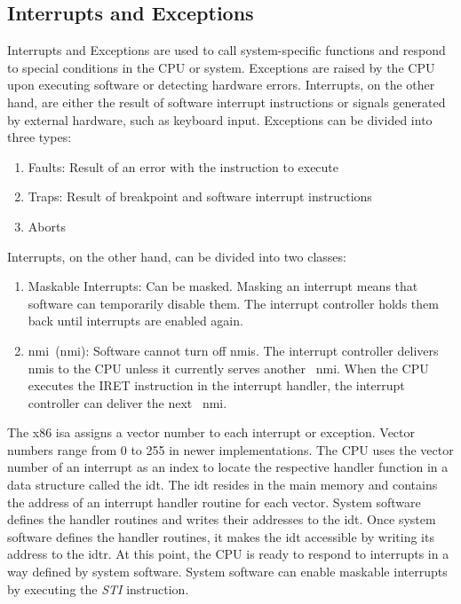 \subsection{Interrupts and Exceptions}
\label{sec:state:technical:interrupts}
Interrupts and Exceptions are used to call system-specific functions and respond
to special conditions in the CPU or system. Exceptions are raised by the CPU
upon executing software or detecting hardware errors. Interrupts, on the other
hand, are either the result of software interrupt instructions or signals
generated by external hardware, such as keyboard input. Exceptions can be
divided into three types:
\begin{enumerate}
    \item Faults: Result of an error with the instruction to execute
    \item Traps: Result of breakpoint and software interrupt instructions
    \item Aborts
\end{enumerate}
Interrupts, on the other hand, can be divided into two classes:
\begin{enumerate}
    \item Maskable Interrupts: Can be masked. Masking an interrupt means that
          software can temporarily disable them. The interrupt controller holds
          them back until interrupts are enabled again.
    \item \Gls{nmi}~(\gls{nmi}): Software cannot turn off
          \glspl{nmi}. The interrupt controller delivers~
          \glspl{nmi} to the CPU unless it currently serves another~
          \gls{nmi}. When the CPU executes the IRET instruction in the
          interrupt handler, the interrupt controller can deliver the next~
          \gls{nmi}.
\end{enumerate}

The x86 \gls{isa} assigns a vector number to each interrupt or exception. Vector
numbers range from 0 to 255 in newer implementations. The CPU uses the vector
number of an interrupt as an index to locate the respective handler function in
a data structure called the \gls{idt}. The \gls{idt} resides in the main memory
and contains the address of an interrupt handler routine for each vector. System
software defines the handler routines and writes their addresses to the
\gls{idt}. Once system software defines the handler routines, it makes the
\gls{idt} accessible by writing its address to the \gls{idtr}. At this point,
the CPU is ready to respond to interrupts in a way defined by system software.
System software can enable maskable interrupts by executing the \textit{STI}
instruction.\\

